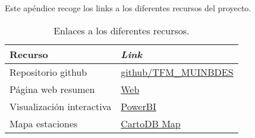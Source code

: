 
Este apéndice recoge  los links a los diferentes recursos del proyecto.


   \begin{table}[H]
	\begin{center}
		\begin{tabular}{|l|l|}
			\hline
			\textbf{Recurso} & \textit{Link} \\
			\hline \hline
			Repositorio github & \href{https://github.com/aguadotzn/TFM\_MUINBDES}{github/TFM\_MUINBDES}  \\ \hline
			Página web resumen & \href{https://aguadotzn.github.io/TFM_MUINBDES/}{Web}  \\ \hline
			Visualización interactiva & \href{https://app.powerbi.com/view?r=eyJrIjoiMmY1NGQ5YjYtYThiMS00YWJhLTllMDEtNmRhNTBhZWQzOTI1IiwidCI6IjJhYTNiMGI1LWE3ODItNGYzOC1hODk4LWU0ODNiMjBlOGQ2MSIsImMiOjh9}{PowerBI}  \\ \hline
			Mapa estaciones & \href{			https://aguadotzn.carto.com/builder/7a6bc6ca-594c-44ad-8bbe-add7757e0f0d/embed}{CartoDB Map}  \\ \hline
			


		\end{tabular}
		\caption{Enlaces a los diferentes recursos.}
	\end{center}
	\label{medidores}
\end{table}   


